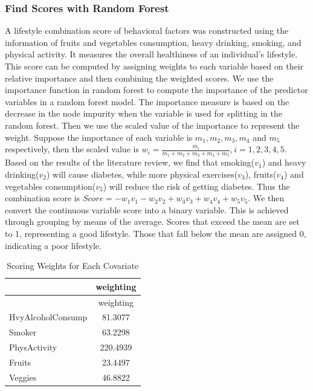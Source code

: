 \documentclass[
  12pt,
]{article}
\begin{document}
\hypertarget{find-scores-with-random-forest}{%
\subsubsection{Find Scores with Random
Forest}\label{find-scores-with-random-forest}}

A lifestyle combination score of behavioral factors was constructed
using the information of fruits and vegetables consumption, heavy
drinking, smoking, and physical activity. It measures the overall
healthiness of an individual's lifestyle. This score can be computed by
assigning weights to each variable based on their relative importance
and then combining the weighted scores. We use the importance function
in random forest to compute the importance of the predictor variables in
a random forest model. The importance measure is based on the decrease
in the node impurity when the variable is used for splitting in the
random forest. Then we use the scaled value of the importance to
represent the weight. Suppose the importance of each variable is
\(m_1, m_2, m_3, m_4\) and \(m_5\) respectively, then the scaled value
is \(w_i=\frac{m_i}{m_1+m_2+m_3+m_4+m_5}, i=1,2,3,4,5\). Based on the
results of the literature review, we find that smoking(\(v_1\)) and
heavy drinking(\(v_2\)) will cause diabetes, while more physical
exercises(\(v_3\)), fruits(\(v_4\)) and vegetables consumption(\(v_5\))
will reduce the risk of getting diabetes. Thus the combination score is
\(Score=-w_1v_1-w_2v_2+w_3v_3+w_4v_4+w_5v_5\). We then convert the
continuous variable score into a binary variable. This is achieved
through grouping by means of the average. Scores that exceed the mean
are set to 1, representing a good lifestyle. Those that fall below the
mean are assigned 0, indicating a poor lifestyle.

\begin{longtable}[]{@{}lc@{}}
\caption{Scoring Weights for Each Covariate}\tabularnewline
\toprule()
& weighting \\
\midrule()
\endfirsthead
\toprule()
& weighting \\
\midrule()
\endhead
HvyAlcoholConsump & 81.3077 \\
Smoker & 63.2298 \\
PhysActivity & 220.4939 \\
Fruits & 23.4497 \\
Veggies & 46.8822 \\
\bottomrule()
\end{longtable}
\end{document}
